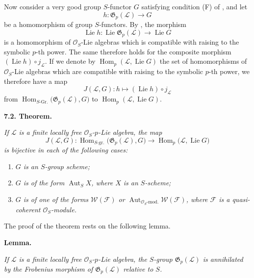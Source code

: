 Now consider a very good group \(S\)-functor \(G\) satisfying
condition (F) of , and let
\[
  h:\mathfrak G_p(\mathcal L)\longrightarrow G
\]
be a homomorphism of group \(S\)-functors. By , the morphism
\[
  \operatorname{Lie}h:
  \operatorname{Lie}\mathfrak G_p(\mathcal L)
  \longrightarrow
  \operatorname{Lie}G
\]
is a homomorphism of \(\mathcal O_S\)-Lie algebras which is compatible
with raising to the symbolic \(p\)-th power. The same therefore holds for
the composite morphism \((\operatorname{Lie}h)\circ j_{\mathcal L}\). If
we denote by \(\operatorname{Hom}_p(\mathcal L,\operatorname{Lie}G)\) the
set of homomorphisms of \(\mathcal O_S\)-Lie algebras which are
compatible with raising to the symbolic \(p\)-th power, we therefore have
a map
\[
  J(\mathcal L,G):
  h\longmapsto(\operatorname{Lie}h)\circ j_{\mathcal L}
\]
from \(\operatorname{Hom}_{S\text{-Gr.}}\bigl(\mathfrak G_p(\mathcal L),G\bigr)\)
to \(\operatorname{Hom}_p(\mathcal L,\operatorname{Lie}G)\).

\medskip
\noindent\textbf{7.2. Theorem.}
\label{sga3:VIIA:7.2}

\textit{If \(\mathcal L\) is a finite locally free
\(\mathcal O_S\)-\(p\)-Lie algebra, the map}
\[
  J(\mathcal L,G):
  \operatorname{Hom}_{S\text{-gr.}}
    \bigl(\mathfrak G_p(\mathcal L),G\bigr)
  \longrightarrow
  \operatorname{Hom}_p
    \bigl(\mathcal L,\operatorname{Lie}G\bigr)
\]
\textit{is bijective in each of the following cases:}
\begin{enumerate}
  \item[\textit{(i)}]
  \textit{\(G\) is an \(S\)-group scheme;}
  \item[\textit{\SGAInlineRefTarget{sga3:VIIA:7.2:item:ii}(ii)}]
  \textit{\(G\) is of the form \(\operatorname{Aut}_S X\), where
  \(X\) is an \(S\)-scheme;}
  \item[\textit{(iii)}]
  \textit{\(G\) is of one of the forms
  \(\mathcal W(\mathcal F)\) or
  \(\operatorname{Aut}_{\mathcal O_S\text{-mod.}}
  \mathcal W(\mathcal F)\), where \(\mathcal F\) is a
  quasi-coherent \(\mathcal O_S\)-module.}
\end{enumerate}

The proof of the theorem rests on the following lemma.

\medskip
\noindent\textbf{Lemma.}
\label{sga3:VIIA:7.2-frobenius-lemma}

\textit{If \(\mathcal L\) is a finite locally free
\(\mathcal O_S\)-\(p\)-Lie algebra, the \(S\)-group
\(\mathfrak G_p(\mathcal L)\) is annihilated by the Frobenius morphism
of \(\mathfrak G_p(\mathcal L)\) relative to \(S\).}

